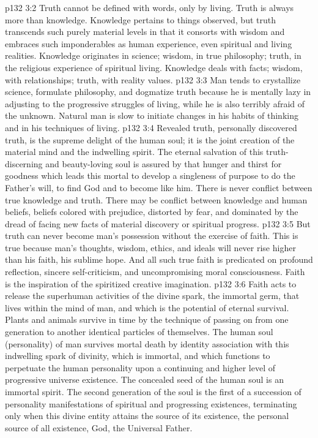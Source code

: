 \pc \vs p132 3:2 Truth cannot be defined with words, only by living. Truth is always more than knowledge. Knowledge pertains to things observed, but truth transcends such purely material levels in that it consorts with wisdom and embraces such imponderables as human experience, even spiritual and living realities. Knowledge originates in science; wisdom, in true philosophy; truth, in the religious experience of spiritual living. Knowledge deals with facts; wisdom, with relationships; truth, with reality values.
\vs p132 3:3 Man tends to crystallize science, formulate philosophy, and dogmatize truth because he is mentally lazy in adjusting to the progressive struggles of living, while he is also terribly afraid of the unknown. Natural man is slow to initiate changes in his habits of thinking and in his techniques of living.
\vs p132 3:4 Revealed truth, personally discovered truth, is the supreme delight of the human soul; it is the joint creation of the material mind and the indwelling spirit. The eternal salvation of this truth\hyp{}discerning and beauty\hyp{}loving soul is assured by that hunger and thirst for goodness which leads this mortal to develop a singleness of purpose to do the Father’s will, to find God and to become like him. There is never conflict between true knowledge and truth. There may be conflict between knowledge and human beliefs, beliefs colored with prejudice, distorted by fear, and dominated by the dread of facing new facts of material discovery or spiritual progress.
\vs p132 3:5 But truth can never become man’s possession without the exercise of faith. This is true because man’s thoughts, wisdom, ethics, and ideals will never rise higher than his faith, his sublime hope. And all such true faith is predicated on profound reflection, sincere self\hyp{}criticism, and uncompromising moral consciousness. Faith is the inspiration of the spiritized creative imagination.
\vs p132 3:6 Faith acts to release the superhuman activities of the divine spark, the immortal germ, that lives within the mind of man, and which is the potential of eternal survival. Plants and animals survive in time by the technique of passing on from one generation to another identical particles of themselves. The human soul (personality) of man survives mortal death by identity association with this indwelling spark of divinity, which is immortal, and which functions to perpetuate the human personality upon a continuing and higher level of progressive universe existence. The concealed seed of the human soul is an immortal spirit. The second generation of the soul is the first of a succession of personality manifestations of spiritual and progressing existences, terminating only when this divine entity attains the source of its existence, the personal source of all existence, God, the Universal Father.
